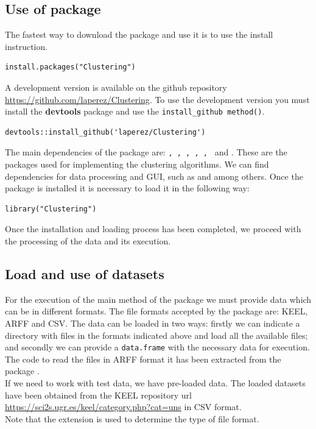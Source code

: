 \subsection{Use of  package}

The fastest way to download the  package and use it is to use the install instruction.

\begin{verbatim}
install.packages("Clustering")
\end{verbatim}
A development version is available on the github repository \url{https://github.com/laperez/Clustering}. To use the development version you must install the \textbf{devtools} package and use the \texttt{install\_github method()}.

\begin{verbatim}
devtools::install_github('laperez/Clustering')
\end{verbatim}
The main dependencies of the   package are: \texttt{,  \citep{R:lucas:2019}, , , , } \citep{R:rodrigues-vasconcelos-tinos-2019} and \texttt{} \citep{R:suzuki-terada-shimodaira:2019}. These are the packages used for implementing the clustering algorithms. We can find dependencies for data processing and GUI, such as \texttt{} and \texttt{} among others. Once the package is installed it is necessary to load it in the following way:

\begin{verbatim}
library("Clustering")
\end{verbatim}
Once the installation and loading process has been completed, we proceed with the processing of the data and its execution.

\subsection {Load and use of datasets}

For the execution of the main method of the package we must provide data which can be in different formats. The file formats accepted by the package are: KEEL, ARFF and CSV. The data can be loaded in two ways: firstly we can indicate a directory with files in the formats indicated above and load all the available files; and secondly we can provide a \texttt{data.frame} with the necessary data for execution. The code to read the files in ARFF format it has been extracted from the  package \citep{R:charte-david:2015}.\\
If we need to work with test data, we have pre-loaded data. The loaded datasets have been obtained from the KEEL repository url \url{https://sci2s.ugr.es/keel/category.php?cat=uns} in CSV format.\\
Note that the extension is used to determine the type of file format.

